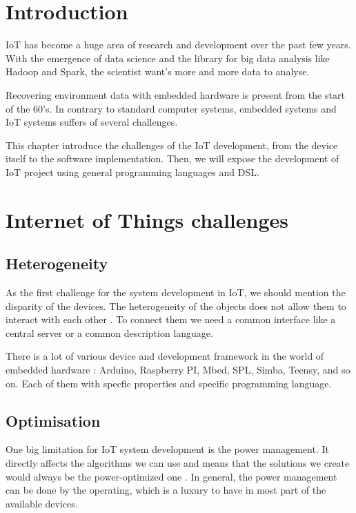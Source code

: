 \label{cha:iot_challenge}

\section{Introduction}
\label{sec:iot_challenge_intro}

\gls{IoT} has become a huge area of research and development over the past few
years. With the emergence of data science and the library for big data analysis
like \gls{Hadoop} and \gls{Spark}, the scientist want's more and more data to
analyse.

Recovering environment data with embedded hardware is present from the start of
the 60's\cite{Community2017}. In contrary to standard computer systems, embedded
systems and \gls{IoT} systems suffers of several challenges.

This chapter introduce the challenges of the \gls{IoT} development, from the device
itself to the software implementation. Then, we will expose the development of
\gls{IoT} project using general programming languages and \gls{DSL}.

\section{Internet of Things challenges}
\label{sec:iot_challenges}

\subsection{Heterogeneity}
\label{sec:heterogeneity}

As the first challenge for the system development in \gls{IoT}, we should
mention the disparity of the devices. The heterogeneity of the objects does not
allow them to interact with each other \cite{midgar}. To connect them we need a
common interface like a central server or a common description language.

There is a lot of various device and development framework in the world of
embedded hardware : Arduino, Raspberry PI, Mbed, SPL, Simba, Teensy, and so
on. Each of them with specfic properties and specific programming language.

\subsection{Optimisation}
\label{sec:iot_challenge_optimisation}

One big limitation for \gls{IoT} system development is the power management. It
directly affects the algorithms we can use and means that the solutions we
create would always be the power-optimized one \cite{Sneps-Sneppe2016}. In
general, the power management can be done by the operating, which is a luxury
to have in most part of the available devices.

